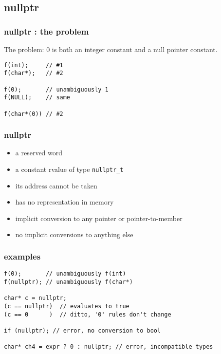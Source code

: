 \subsection{nullptr}
\lyxframeend{}


\begin{frame}[fragile]
\frametitle{nullptr : the problem}

The problem: 0 is both an integer constant and a null pointer
constant.

{\scriptsize
\begin{verbatim}
f(int);     // #1
f(char*);   // #2

f(0);       // unambiguously 1
f(NULL);    // same

f(char*(0)) // #2

\end{verbatim}
}
\end{frame}

\begin{frame}[fragile]
\frametitle{nullptr}

\begin{itemize}
\item a reserved word
\item a constant rvalue of type \texttt{nullptr\_t}
\item its address cannot be taken
\item has no representation in memory
\item implicit conversion to any pointer or pointer-to-member
\item no implicit conversions to anything else
\end{itemize}
\end{frame}
\begin{frame}[fragile]
\frametitle{examples}
{\scriptsize
\begin{verbatim}
f(0);       // unambiguously f(int)
f(nullptr); // unambiguously f(char*)

char* c = nullptr;
(c == nullptr)  // evaluates to true
(c == 0      )  // ditto, '0' rules don't change

if (nullptr); // error, no conversion to bool

char* ch4 = expr ? 0 : nullptr; // error, incompatible types

\end{verbatim}
}




\end{frame}
